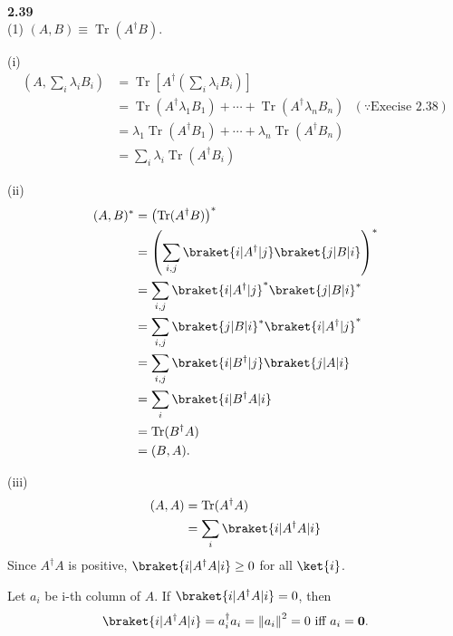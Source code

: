 \documentclass[10pt]{book}
\DeclareMathOperator{\Tr}{Tr}
\newcommand{\norm}[1]{\left\lVert#1\right\rVert} %
\newcommand{\Textbf}[1]{\hspace{3mm}\\ \textbf{#1}\\}
\begin{document}
	
	
	
	\Textbf{2.39}
	
	(1) $(A, B) \equiv \Tr (A^\dagger B)$.
	
	\vspace{5mm}
	(i)
	\begin{equation}
\begin{aligned}
		\left(A, \sum_i \lambda_i B_i \right) &= \Tr \left[ A^\dagger \left(\sum_i \lambda_i B_i  \right) \right]\\
		&= \Tr (A^\dagger \lambda_1 B_1) + \cdots +  \Tr (A^\dagger \lambda_n B_n) ~~~ (\because \text{Execise 2.38}) \\
		&= \lambda_1 \Tr (A^\dagger B_1)  + \cdots  + \lambda_n \Tr (A^\dagger B_n) \\
		&= \sum_i \lambda_i \Tr (A^\dagger B_i)
	\end{aligned}
\end{equation}
	
	
	(ii)
	\begin{equation}
\begin{aligned}
		(A, B)^* &= \left( \Tr (A^\dagger B) \right)^*\\
		&= \left(\sum_{i,j} \braket{ i | A^\dagger | j} \braket{j | B | i}  \right)^*\\
		&= \sum_{i,j} \braket{ i | A^\dagger | j}^* \braket{j | B | i}^*\\
		&= \sum_{i,j}  \braket{j | B | i}^* \braket{ i | A^\dagger | j}^*\\
		&=  \sum_{i,j}  \braket{i | B^\dagger | j} \braket{ j | A | i}\\
		&= \sum_i \braket{i | B^\dagger A | i} \\
		&= \Tr (B^\dagger A)\\
		&= (B, A).
	\end{aligned}
\end{equation}
	
	
	(iii)
	\begin{equation}
\begin{aligned}
		(A, A) &= \Tr (A^\dagger A)\\
		&= \sum_i \braket{ i | A^\dagger A | i }
	\end{aligned}
\end{equation}
	Since $A^\dagger A$ is positive, $\braket{ i | A^\dagger A | i } \geq 0$ for all $\ket{ i }$.
	
	
	Let $a_i$ be i-th column of $A$.
	If $\braket{ i | A^\dagger A | i } = 0$, then
	\begin{equation}
\begin{aligned}
		\braket{ i | A^\dagger A | i } = a^\dagger_i a_i = \norm{a_i}^2 = 0 \text{ iff }a_i = \mathbf{0}.
	\end{aligned}
\end{equation}
	
\end{document}
